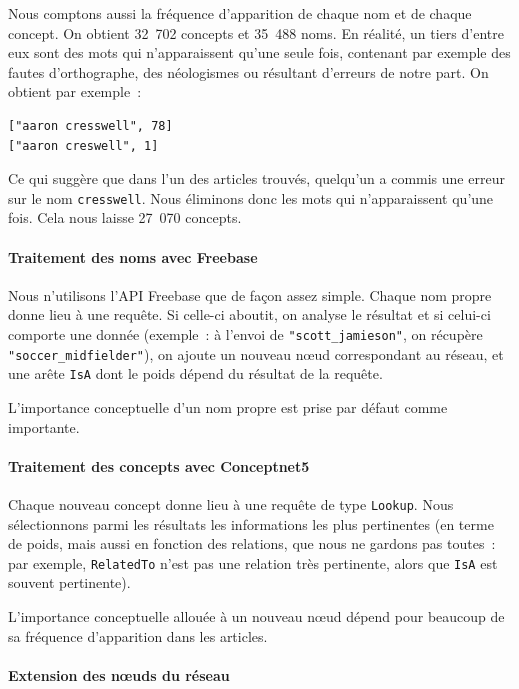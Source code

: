 \documentclass[a4paper, 12pt]{article}
\begin{document}
Nous comptons aussi la fréquence d'apparition de chaque nom et de chaque concept.
On obtient 32~702 concepts et 35~488 noms. En réalité, un tiers d'entre eux sont des mots qui n'apparaissent qu'une seule fois, contenant par exemple des fautes d'orthographe, des néologismes ou résultant d'erreurs de notre part. On obtient par exemple~:
\begin{verbatim}
["aaron cresswell", 78]
["aaron creswell", 1]
\end{verbatim}
Ce qui suggère que dans l'un des articles trouvés, quelqu'un a commis une erreur sur le nom \verb|cresswell|. Nous éliminons donc les mots qui n'apparaissent qu'une fois. Cela nous laisse 27~070 concepts.

\paragraph{Traitement des noms avec Freebase}

Nous n'utilisons l'API Freebase que de fa\c{c}on assez simple. Chaque nom propre donne lieu à une requête. Si celle-ci aboutit, on analyse le résultat et si celui-ci comporte une donnée (exemple~: à l'envoi de \verb|"scott_jamieson"|, on récupère \verb|"soccer_midfielder"|), on ajoute un nouveau n\oe{}ud correspondant au réseau, et une arête \verb|IsA| dont le poids dépend du résultat de la requête.

L'importance conceptuelle d'un nom propre est prise par défaut comme importante.

\paragraph{Traitement des concepts avec Conceptnet5}

Chaque nouveau concept donne lieu à une requête de type \verb|Lookup|. Nous sélectionnons parmi les résultats les informations les plus pertinentes (en terme de poids, mais aussi en fonction des relations, que nous ne gardons pas toutes~: par exemple, \verb|RelatedTo| n'est pas une relation très pertinente, alors que \verb|IsA| est souvent pertinente).

L'importance conceptuelle allouée à un nouveau n\oe{}ud dépend pour beaucoup de sa fréquence d'apparition dans les articles.


\paragraph{Extension des nœuds du réseau}
\end{document}
